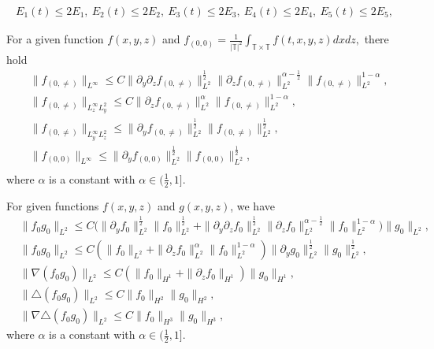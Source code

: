 \documentclass[10pt,a4paper]{amsart}
\begin{document}
	\begin{equation} \label{assumption}	
		\begin{aligned}
			E_1(t)\leq 2E_1, \
			E_2(t)\leq 2E_2, \
			E_3(t)\leq 2E_3, \
			E_4(t)\leq 2E_4, \
			E_5(t)\leq 2E_5,
		\end{aligned}
	\end{equation}

	\begin{lemma}\label{sob_inf_3}
		For a given function $f(x,y,z)$ and $f_{(0,0)}=\frac{1}{|\mathbb{T}|^2}\int_{\mathbb{T}\times\mathbb{T}}{f}(t,x,y,z)dxdz,$ there hold
		\begin{equation}\label{sob_result_3}
			\begin{aligned}
				&\|f_{(0,\neq)}\|_{L^{\infty}}\leq C\|\partial_y\partial_zf_{(0,\neq)}\|^{\frac{1}{2}}_{L^2}
				\|\partial_zf_{(0,\neq)}\|^{\alpha-\frac{1}{2}}_{L^2}
				\|f_{(0,\neq)}\|^{1-\alpha}_{L^2},\\
				&\|f_{(0,\neq)}\|_{L^{\infty}_{z}L^2_y}\leq C\|\partial_zf_{(0,\neq)}\|_{L^2}^{\alpha}\|f_{(0,\neq)}\|_{L^2}^{1-\alpha},\\
				&\|f_{(0,\neq)}\|_{L^{\infty}_yL^{2}_{z}}
				\leq \|\partial_yf_{(0,\neq)}\|_{L^2}^{\frac{1}{2}}
				\|f_{(0,\neq)}\|_{L^2}^{\frac{1}{2}},\\
				&\|f_{(0,0)}\|_{L^{\infty}}\leq 
				\|\partial_yf_{(0,0)}\|^{\frac{1}{2}}_{L^2}\|f_{(0,0)}\|^{\frac{1}{2}}_{L^2},\\
			\end{aligned}
		\end{equation}	
		where $\alpha$ is a constant with $\alpha\in(\frac{1}{2},1].$
	\end{lemma}

	\begin{lemma}\label{sob_12}
		For  given functions $f(x,y,z)$ and $g(x,y,z)$, we have
		\begin{equation}\label{sob_result_4}
			\begin{aligned}
				&\|f_{0}g_{0}\|_{L^{2}}
				\leq C\big(\|\partial_yf_{0}\|^{\frac{1}{2}}_{L^2}\|f_{0}\|^{\frac{1}{2}}_{L^2}+\|\partial_y\partial_zf_{0}\|^{\frac{1}{2}}_{L^2}
				\|\partial_zf_{0}\|^{\alpha-\frac{1}{2}}_{L^2}
				\|f_{0}\|^{1-\alpha}_{L^2}\big)\|g_{0}\|_{L^{2}},\\
				&\|f_{0}g_{0}\|_{L^{2}}
				\leq C\left(\|f_{0}\|_{L^2}+\|\partial_zf_{0}\|_{L^2}^{\alpha}\|f_0\|_{L^2}^{1-\alpha}\right)\|\partial_yg_{0}\|_{L^2}^{\frac{1}{2}}
				\|g_{0}\|_{L^2}^{\frac{1}{2}},\\
				&\|\nabla(f_{0}g_{0})\|_{L^{2}}
				\leq C(\|f_{0}\|_{H^1}+\|\partial_zf_{0}\|_{H^1})\|g_{0}\|_{H^{1}},\\
				&\|\triangle(f_{0}g_{0})\|_{L^{2}}
				\leq C\|f_{0}\|_{H^2}\|g_{0}\|_{H^{2}},\\
				&\|\nabla\triangle(f_{0}g_{0})\|_{L^{2}}
				\leq C\|f_{0}\|_{H^3}\|g_{0}\|_{H^{3}},
			\end{aligned}
		\end{equation}	
		where $ \alpha $ is a constant with $\alpha\in(\frac12,1].$
	\end{lemma}
\end{document}
